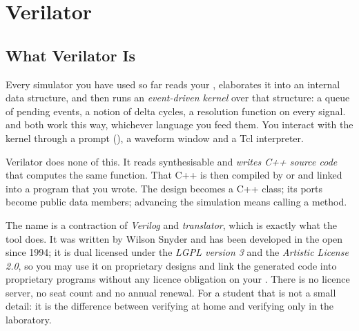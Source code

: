 \chapter{Verilator}
\label{ch:verilator}


\section{What Verilator Is}
\label{sec:verilator:what}

Every simulator you have used so far reads your \VHDL{},
elaborates it into an internal data structure, and then runs an
\emph{event-driven kernel} over that structure: a queue of pending events, a
notion of delta cycles, a resolution function on every signal. 
and  both work this way, whichever language you feed them.
You interact with the kernel through a prompt (), a waveform window
and a Tcl interpreter.

Verilator does none of this. It reads synthesisable \SV{} and \emph{writes C++
source code} that computes the same function. That C++ is then compiled by
 or  and linked into a program that you wrote. The
design becomes a C++ class; its ports become public data members; advancing
the simulation means calling a method.

The name is a contraction of \emph{Verilog} and
\emph{translator}, which is exactly what the tool does. It was written by
Wilson Snyder and has been developed in the open since 1994; it is dual
licensed under the \emph{LGPL version 3} and the \emph{Artistic License 2.0},
so you may use it on proprietary designs and link the generated code into
proprietary programs without any licence obligation on your \RTL{}. There is
no licence server, no seat count and no annual renewal. For a student that is
not a small detail: it is the difference between verifying at home and
verifying only in the laboratory.

